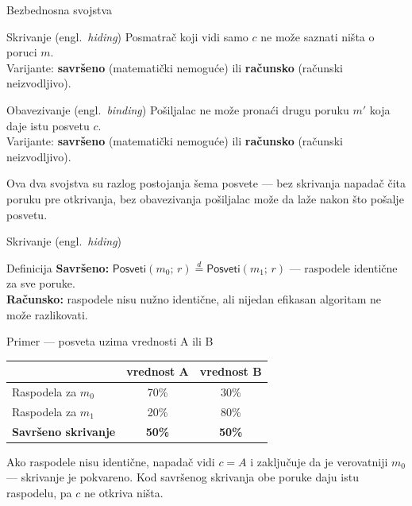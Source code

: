 \documentclass[aspectratio=1610]{beamer}
\newcommand{\keyword}[1]{\textcolor{wcprimary}{\textbf{#1}}}
\begin{document}
\begin{frame}{Bezbednosna svojstva}
\begin{block}{Skrivanje \textnormal{(engl.\ \textit{hiding})}}
  Posmatrač koji vidi samo $c$ ne može saznati ništa o poruci $m$.\\
  Varijante: \keyword{savršeno} (matematički nemoguće) ili \keyword{računsko} (računski neizvodljivo).
\end{block}
\begin{alertblock}{Obavezivanje \textnormal{(engl.\ \textit{binding})}}
  Pošiljalac ne može pronaći drugu poruku $m'$ koja daje istu posvetu $c$.\\
  Varijante: \keyword{savršeno} (matematički nemoguće) ili \keyword{računsko} (računski neizvodljivo).
\end{alertblock}
\vspace{4pt}
{\footnotesize * Ova dva svojstva su razlog postojanja šema posvete — bez skrivanja napadač čita poruku pre otkrivanja, bez obavezivanja pošiljalac može da laže nakon što pošalje posvetu.}
\end{frame}

\begin{frame}{Skrivanje \textnormal{(engl.\ \textit{hiding})}}
\begin{block}{Definicija}
  \textbf{Savršeno:} $\mathsf{Posveti}(m_0;\, r) \overset{d}{=} \mathsf{Posveti}(m_1;\, r)$ — raspodele identične za sve poruke.\\[4pt]
  \textbf{Računsko:} raspodele nisu nužno identične, ali nijedan efikasan algoritam ne može razlikovati.
\end{block}

\begin{exampleblock}{Primer — posveta uzima vrednosti A ili B}
\begin{center}
\begin{tabular}{lcc}
  \toprule
  & vrednost A & vrednost B \\
  \midrule
  Raspodela za $m_0$ & 70\% & 30\% \\
  Raspodela za $m_1$ & 20\% & 80\% \\
  \midrule
  \textbf{Savršeno skrivanje} & \textbf{50\%} & \textbf{50\%} \\
  \bottomrule
\end{tabular}
\end{center}
{\footnotesize * Ako raspodele nisu identične, napadač vidi $c = A$ i zaključuje da je verovatniji $m_0$ — skrivanje je pokvareno. Kod savršenog skrivanja obe poruke daju istu raspodelu, pa $c$ ne otkriva ništa.}
\end{exampleblock}
\end{frame}
\end{document}
